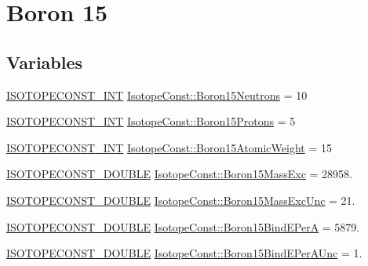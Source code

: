 \hypertarget{group___isotope_const-_boron-_b15}{}\section{Boron 15}
\label{group___isotope_const-_boron-_b15}
\subsection*{Variables}
\begin{DoxyCompactItemize}
\item 
\mbox{\hyperlink{group___isotope_const-_macros_ga5f18360b3e99483a35c32d789e62621c}{I\+S\+O\+T\+O\+P\+E\+C\+O\+N\+S\+T\+\_\+\+I\+NT}} \mbox{\hyperlink{group___isotope_const-_boron-_b15_gaaa485148a90557d3691bf3a56a78695d}{Isotope\+Const\+::\+Boron15\+Neutrons}} = 10
\item 
\mbox{\hyperlink{group___isotope_const-_macros_ga5f18360b3e99483a35c32d789e62621c}{I\+S\+O\+T\+O\+P\+E\+C\+O\+N\+S\+T\+\_\+\+I\+NT}} \mbox{\hyperlink{group___isotope_const-_boron-_b15_gaf50956b5f1c5a16f0ac206dbb7ce7eb0}{Isotope\+Const\+::\+Boron15\+Protons}} = 5
\item 
\mbox{\hyperlink{group___isotope_const-_macros_ga5f18360b3e99483a35c32d789e62621c}{I\+S\+O\+T\+O\+P\+E\+C\+O\+N\+S\+T\+\_\+\+I\+NT}} \mbox{\hyperlink{group___isotope_const-_boron-_b15_gacdba15d684a744862cb8d8a1b69a82eb}{Isotope\+Const\+::\+Boron15\+Atomic\+Weight}} = 15
\item 
\mbox{\hyperlink{group___isotope_const-_macros_ga8f45a7272ce02c0b4c65c44636ed719a}{I\+S\+O\+T\+O\+P\+E\+C\+O\+N\+S\+T\+\_\+\+D\+O\+U\+B\+LE}} \mbox{\hyperlink{group___isotope_const-_boron-_b15_ga330609d4122d4b8a3e156153dccebcff}{Isotope\+Const\+::\+Boron15\+Mass\+Exc}} = 28958.
\item 
\mbox{\hyperlink{group___isotope_const-_macros_ga8f45a7272ce02c0b4c65c44636ed719a}{I\+S\+O\+T\+O\+P\+E\+C\+O\+N\+S\+T\+\_\+\+D\+O\+U\+B\+LE}} \mbox{\hyperlink{group___isotope_const-_boron-_b15_gac137b1d969a7856575ad4c8b20e8bf3c}{Isotope\+Const\+::\+Boron15\+Mass\+Exc\+Unc}} = 21.
\item 
\mbox{\hyperlink{group___isotope_const-_macros_ga8f45a7272ce02c0b4c65c44636ed719a}{I\+S\+O\+T\+O\+P\+E\+C\+O\+N\+S\+T\+\_\+\+D\+O\+U\+B\+LE}} \mbox{\hyperlink{group___isotope_const-_boron-_b15_ga72e4d2c16c18b386a04531aa057dc0c5}{Isotope\+Const\+::\+Boron15\+Bind\+E\+PerA}} = 5879.
\item 
\mbox{\hyperlink{group___isotope_const-_macros_ga8f45a7272ce02c0b4c65c44636ed719a}{I\+S\+O\+T\+O\+P\+E\+C\+O\+N\+S\+T\+\_\+\+D\+O\+U\+B\+LE}} \mbox{\hyperlink{group___isotope_const-_boron-_b15_ga35b2e4be65181a55a536ed197dd30409}{Isotope\+Const\+::\+Boron15\+Bind\+E\+Per\+A\+Unc}} = 1.

\end{DoxyCompactItemize}
